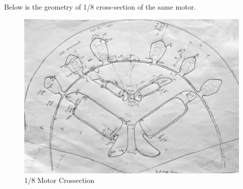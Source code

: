 \documentclass{report} %
\begin{document}
Below is the geometry of 1/8 cross-section of the same motor.

\begin{figure}[H]
    \centering
    \includegraphics[width=1\textwidth]{./ReportImages/EMCrosssectionFiltered.png} 
    \caption{1/8 Motor Crossection}
    \label{fig:1/8 Motor Crossection}
\end{figure}

\newpage 
\end{document}
